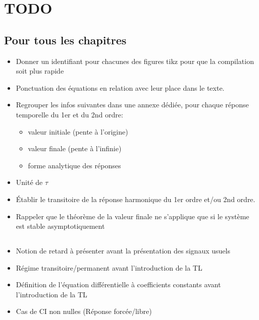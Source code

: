 \chapter{TODO}

\section*{Pour tous les chapitres}
\begin{itemize}
\item Donner un identifiant pour chacunes des figures tikz pour que la compilation soit plus rapide
\item Ponctuation des équations en relation avec leur place dans le texte.
\item Regrouper les infos suivantes dans une annexe dédiée, pour chaque réponse temporelle du 1er et du 2nd ordre:
    \begin{itemize}
        \item valeur initiale (pente à l'origine)
        \item valeur finale (pente à l'infinie)
        \item forme analytique des réponses
    \end{itemize}
\item Unité de $\tau$
\item \'Etablir le transitoire de la réponse harmonique du 1er ordre et/ou 2nd ordre.
\item Rappeler que le théorème de la valeur finale ne s'applique que si le système est stable asymptotiquement
\end{itemize}

\section*{}     

\section*{}     
\begin{itemize}
\item Notion de retard à présenter avant la présentation des signaux usuels
\item Régime transitoire/permanent avant l'introduction de la TL
\item Définition de l'équation différentielle à coefficients constants avant l'introduction de la TL
    \item Cas de CI non nulles (Réponse forcée/libre)
\end{itemize}
